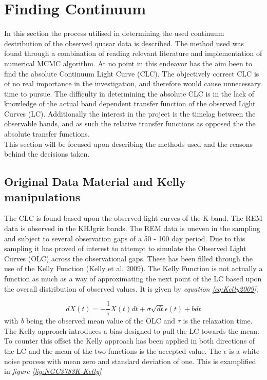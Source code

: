 \documentclass[11pt]{article}
\begin{document}
\section{Finding Continuum}
In this section the process utilised in determining the used continuum destribution of the observed quasar data is described. The method used was found through a combination of reading relevant literature and implementation of numerical MCMC algorithm. At no point in this endeavor has the aim been to find the absolute Continuum Light Curve (CLC). The objectively correct CLC is of no real importance in the investigation, and therefore would cause unnecessary time to pursue. The difficulty in determining the absolute CLC is in the lack of knowledge of the actual band dependent transfer function of the observed Light Curves (LC). Additionally the interest in the project is the timelag between the observable bands, and as such the relative transfer functions as opposed the the absolute transfer functions. \\
This section will be focused upon describing the methods used and the reasons behind the decisions taken.\\

\subsection{Original Data Material and Kelly manipulations}
The CLC is found based upon the observed light curves of the K-band. The REM data is observed in the KHJgriz bands. The REM data is uneven in the sampling and subject to several observation gaps of a 50 - 100 day period. Due to this sampling it has proved of interest to attempt to simulate the Observed Light Curves (OLC) across the observational gaps. These has been filled through the use of the Kelly Function (Kelly et al. 2009). The Kelly Function is not actually a function as much as a way of approximating the next point of the LC based upon the overall distribution of observed values. It is given by \emph{equation \ref{eq:Kelly2009}},

\begin{equation}
dX(t) = -\frac{1}{\tau}X(t)dt + \sigma\sqrt{dt}\epsilon(t) + bdt
\label{eq:Kelly2009}
\end{equation}
with \emph{b} being the observed mean value of the OLC and $\tau$ is the relaxation time. The Kelly approach introduces a bias designed to pull the LC towards the mean. To counter this offset the Kelly approach has been applied in both directions of the LC and the mean of the two functions is the accepted value. The $\epsilon$ is a white noise process with mean zero and standard deviation of one. This is examplified in \emph{figure \ref{fig:NGC3783K-Kelly}}
\end{document}
